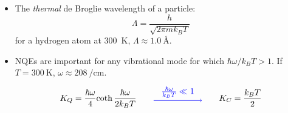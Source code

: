 \begin{frame}
\begin{itemize}
    
    \item The \emph{thermal} de Broglie wavelength of a particle:
    $$
    \Lambda = \frac{h}{\sqrt{2\pi m k_B T}}
    $$
    for a hydrogen atom at \SI{300}{\kelvin}, $\Lambda \approx \SI{1.0}{\angstrom}$.

    \item NQEs are important for any vibrational mode for which 
    $\hbar\omega /k_B T > 1$. If $T = \SI{300}{\kelvin}$, $\omega \approx \SI{208}{\per\cm}$.
    \begin{equation*}
      K_Q = {\hbar\omega\over4}{\coth{\hbar\omega\over2k_BT}}
      \qquad
      \tikz \draw [->=shealth, blue, line width=0.5pt] (0, 0) -- node[above,
      midway]{${\hbar\omega\over k_BT} \ll 1$} (2.0, 0.0);
      \qquad
      K_C = {k_B T \over 2}
    \end{equation*}
  \end{itemize}
\end{frame}
